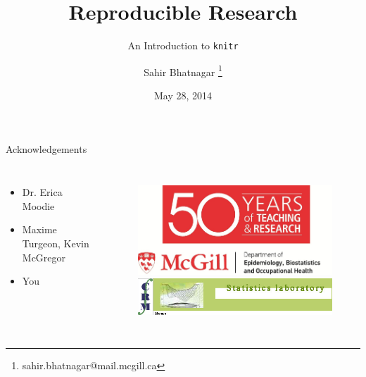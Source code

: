 \documentclass[10pt]{beamer}\usepackage[]{graphicx}\usepackage[]{color}
\begin{document}
\title[RR: Intro to \texttt{knitr}]{Reproducible Research}
\subtitle{An Introduction to \texttt{knitr}}

\author[]{Sahir Bhatnagar%
\thanks{sahir.bhatnagar@mail.mcgill.ca%
}}

\date{May 28, 2014}


\maketitle

\begin{frame}{Acknowledgements}
\begin{columns}[c] %


\begin{itemize}
\item Dr. Erica Moodie
\item Maxime Turgeon, Kevin McGregor
\item You
\end{itemize}

\begin{figure}
\includegraphics[width=0.6\columnwidth]{eboh50.pdf}\\[5mm]
\includegraphics[width=1.0\columnwidth]{crm.png}
\end{figure}

\end{columns}
\end{frame}
\end{document}
